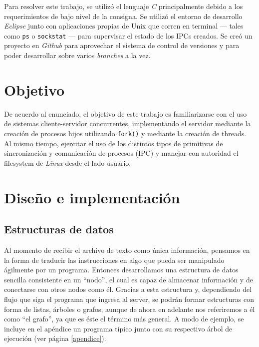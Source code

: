 \documentclass[a4paper, 10pt]{article}
\begin{document}
Para resolver este trabajo, se utilizó el lenguaje \textit{C} principalmente debido a los requerimientos de bajo nivel de la consigna. Se utilizó el entorno de desarrollo \textit{Eclipse} junto con aplicaciones propias de Unix que corren en terminal --- tales como {\tt ps} o {\tt sockstat} --- para supervisar el estado de los IPCs creados. Se creó un proyecto en \textit{Github} para aprovechar el sistema de control de versiones y para poder desarrollar sobre varios \textit{branches} a la vez.\\

\section{Objetivo}

De acuerdo al enunciado, el objetivo de este trabajo es familiarizarse con el uso de sistemas cliente-servidor concurrentes, implementando el servidor mediante la creación de procesos hijos utilizando {\tt fork()} y mediante la creación de threads. Al mismo tiempo, ejercitar el uso de los distintos tipos de primitivas de sincronización y comunicación de procesos (IPC) y manejar con autoridad el filesystem de \textit{Linux} desde el lado usuario.\\

\section{Diseño e implementación}

\subsection{Estructuras de datos}
Al momento de recibir el archivo de texto como única información, pensamos en la forma de traducir las instrucciones en algo que pueda ser manipulado ágilmente por un programa. Entonces desarrollamos una estructura de datos sencilla consistente en un “nodo”, el cual es capaz de almacenar información y de conectarse con otros nodos como él. Gracias a esta estructura y, dependiendo del flujo que siga el programa que ingresa al server, se podrán formar estructuras con forma de listas, árboles o grafos, aunque de ahora en adelante nos referiremos a él como “el grafo”, ya que es éste el término más general. A modo de ejemplo, se incluye en el apéndice un programa típico junto con su respectivo árbol de ejecución (ver página \ref{apendice}).\\
\end{document}
